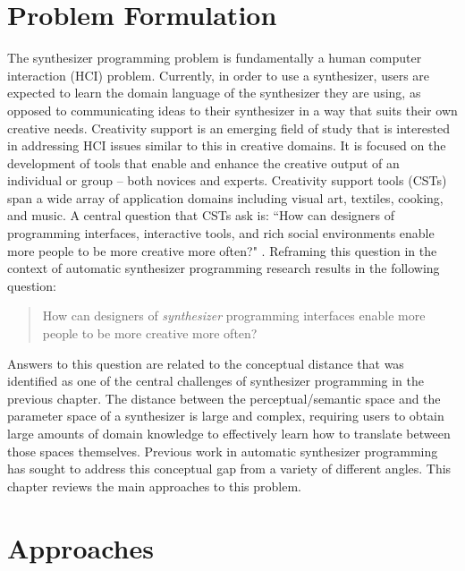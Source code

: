 \section{Problem Formulation}
The synthesizer programming problem is fundamentally a human computer interaction (HCI) problem. Currently, in order to use a synthesizer, users are expected to learn the domain language of the synthesizer they are using, as opposed to communicating ideas to their synthesizer in a way that suits their own creative needs. Creativity support is an emerging field of study that is interested in addressing HCI issues similar to this in creative domains. It is focused on the development of tools that enable and enhance the creative output of an individual or group -- both novices and experts. Creativity support tools (CSTs) \cite{shneiderman2007creativity} span a wide array of application domains including visual art, textiles, cooking, and music. A central question that CSTs ask is: ``How can designers of programming interfaces, interactive tools, and rich social environments enable more people to be more creative more often?" \cite{shneiderman2007creativity}. Reframing this question in the context of automatic synthesizer programming research results in the following question:
\begin{quote}
    How can designers of \textit{synthesizer} programming interfaces enable more people to be more creative more often?
\end{quote}

Answers to this question are related to the conceptual distance that was identified as one of the central challenges of synthesizer programming in the previous chapter. The distance between the perceptual/semantic space and the parameter space of a synthesizer is large and complex, requiring users to obtain large amounts of domain knowledge to effectively learn how to translate between those spaces themselves. Previous work in automatic synthesizer programming has sought to address this conceptual gap from a variety of different angles. This chapter reviews the main approaches to this problem.

\section{Approaches}


